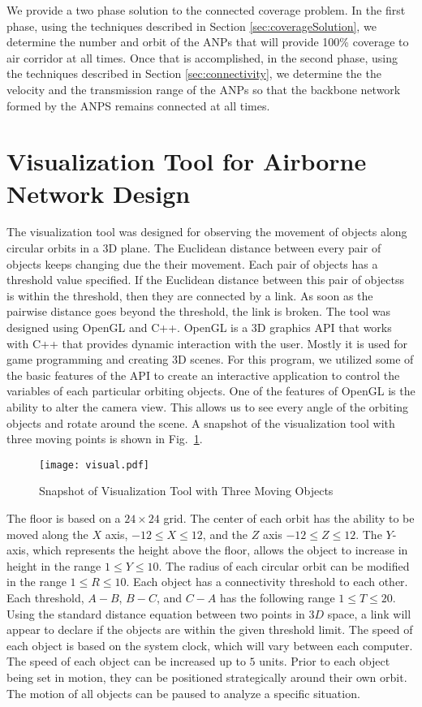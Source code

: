 \documentclass[10pt]{IEEEtran}
\begin{document}
We provide a two phase solution to the connected coverage problem. In the first phase, using the techniques described in Section \ref{sec:coverageSolution}, we determine the number and orbit of the ANPs that will provide 100\% coverage to air corridor at all times. Once that is accomplished, in the second phase, using the techniques described in Section \ref{sec:connectivity}, we determine the the velocity and the transmission range of the ANPs so that  the backbone network formed by the ANPS remains connected at all times. 

\section{Visualization Tool for Airborne Network Design}
\label{sec:visualization}
The visualization tool was designed for observing the movement of objects along circular orbits in a 3D plane. The Euclidean distance between every pair of objects keeps changing due the their movement. Each pair of objects has a threshold value specified. If the Euclidean distance between this pair of objectss is within the threshold, then they are connected by a link. As soon as the pairwise distance goes beyond the threshold, the link is broken. The tool was designed using OpenGL and C++. OpenGL is a 3D graphics API that works with C++ that provides dynamic interaction with the user. Mostly it is used for game programming and creating 3D scenes. For this program, we utilized some of the basic features of the API to create an interactive application to control the variables of each particular orbiting objects. One of the features of OpenGL is the ability to alter the camera view. This allows us to see every angle of the orbiting objects and rotate around the scene. A snapshot of the visualization tool with three moving points is shown in Fig.~\ref{fig:viz}.

\begin{figure}
\centering
\texttt{[image: visual.pdf]}
\caption{Snapshot of Visualization Tool with Three Moving Objects}
\label{fig:viz}
\end{figure}

The floor is based on a $24 \times 24$ grid. The center of each orbit has the ability to be moved along the $X$ axis, $-12 \leq X \leq 12$,  and the $Z$ axis $-12 \leq Z \leq 12$. The $Y$-axis, which represents the height above the floor, allows the object to increase in height in the range $1 \leq  Y \leq 10$. The radius of each circular orbit can be modified in the range $1 \leq R \leq 10$. Each object has a connectivity threshold to each other. Each threshold, $A-B$, $B-C$, and $C-A$ has the following range $1 \leq T \leq 20$. Using the standard distance equation between two points in $3D$ space, a link will appear to declare if the objects are within the given threshold limit. The speed of each object is based on the system clock, which will vary between each computer. The speed of each object can be increased up to $5$ units. Prior to each object being set in motion, they can be positioned strategically around their own orbit. The motion of all objects can be paused to analyze a specific situation. 
\end{document}
